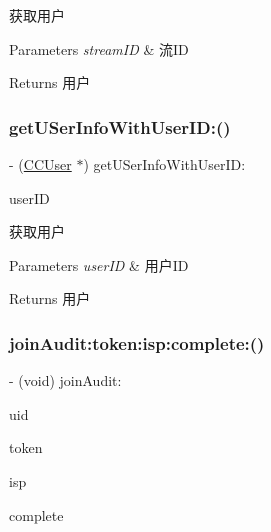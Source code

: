 获取用户


\begin{DoxyParams}{Parameters}
{\em stream\+ID} & 流\+ID \\
\hline
\end{DoxyParams}
\begin{DoxyReturn}{Returns}
用户 
\end{DoxyReturn}
\mbox{\label{interface_c_c_streamer_basic_aca867160cb49c555e62bd5b18e7ed279}} 
\subsubsection{\texorpdfstring{get\+U\+Ser\+Info\+With\+User\+I\+D\+:()}{getUSerInfoWithUserID:()}}
{\footnotesize\ttfamily -\/ (\hyperlink{interface_c_c_user}{C\+C\+User} $\ast$) get\+U\+Ser\+Info\+With\+User\+I\+D\+: \begin{DoxyParamCaption}\item[{(N\+S\+String $\ast$)}]{user\+ID }\end{DoxyParamCaption}}

获取用户


\begin{DoxyParams}{Parameters}
{\em user\+ID} & 用户\+ID \\
\hline
\end{DoxyParams}
\begin{DoxyReturn}{Returns}
用户 
\end{DoxyReturn}
\mbox{\label{interface_c_c_streamer_basic_a3c49ff3e0e96a1001913c6cd9a0ebc36}} 
\subsubsection{\texorpdfstring{join\+Audit\+:token\+:isp\+:complete\+:()}{joinAudit:token:isp:complete:()}}
{\footnotesize\ttfamily -\/ (void) join\+Audit\+: \begin{DoxyParamCaption}\item[{(N\+S\+String $\ast$)}]{uid }\item[{token:(N\+S\+String $\ast$)}]{token }\item[{isp:(N\+S\+String $\ast$)}]{isp }\item[{complete:(C\+C\+Comletion\+Block)}]{complete }\end{DoxyParamCaption}}

